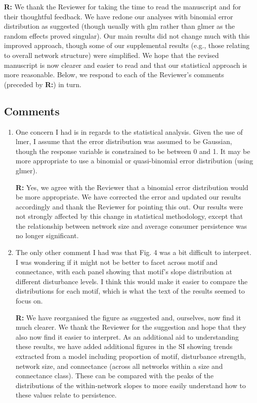 \documentclass[12pt]{article}
\begin{document}
    \textbf{R:} We thank the Reviewer for taking the time to read the manuscript and for their thoughtful feedback. We have redone our analyses with binomial error distribution as suggested (though usually with glm rather than glmer as the random effects proved singular). Our main results did not change much with this improved approach, though some of our supplemental results (e.g., those relating to overall network structure) were simplified. We hope that the revised manuscript is now clearer and easier to read and that our statistical approach is more reasonable. Below, we respond to each of the Reviewer's comments (preceded by \textbf{R:}) in turn.

    \subsection*{Comments}

        \begin{enumerate}

            \item One concern I had is in regards to the statistical analysis. Given the use of lmer, I assume that the error distribution was assumed to be Gaussian, though the response variable is constrained to be between 0 and 1. It may be more appropriate to use a binomial or quasi-binomial error distribution (using glmer).

            \textbf{R:} Yes, we agree with the Reviewer that a binomial error distribution would be more appropriate. We have corrected the error and updated our results accordingly and thank the Reviewer for pointing this out. Our results were not strongly affected by this change in statistical methodology, except that the relationship between network size and average consumer persistence was no longer significant.

            \item The only other comment I had was that Fig. 4 was a bit difficult to interpret. I was wondering if it might not be better to facet across motif and connectance, with each panel showing that motif's slope distribution at different disturbance levels. I think this would make it easier to compare the distributions for each motif, which is what the text of the results seemed to focus on.

            \textbf{R:} We have reorganised the figure as suggested and, ourselves, now find it much clearer. We thank the Reviewer for the suggestion and hope that they also now find it easier to interpret. As an additional aid to understanding these results, we have added additional figures in the SI showing trends extracted from a model including proportion of motif, disturbance strength, network size, and connectance (across all networks within a size and connectance class). These can be compared with the peaks of the distributions of the within-network slopes to more easily understand how to these values relate to persistence.

        \end{enumerate}
\end{document}
